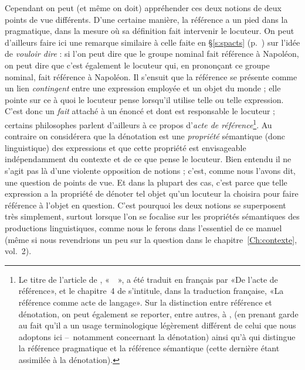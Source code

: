Cependant on peut (et même on doit) appréhender ces deux notions de
deux points de vue différents.  D'une certaine manière, la référence a
un pied dans la pragmatique, dans la mesure où sa définition fait
intervenir le locuteur.  On peut d'ailleurs faire ici une remarque
similaire à celle faite en \S\ref{s:spacts} (p.~\pageref{s:spacts})
sur l'idée de \emph{vouloir dire} : si l'on peut dire que le groupe
nominal  fait référence à Napoléon,
on peut dire 
que c'est également le locuteur qui, en prononçant ce groupe nominal,
fait référence à Napoléon.  Il s'ensuit que la référence se présente
comme un lien \emph{contingent} entre une expression employée et un
objet du monde ; elle pointe sur ce à quoi le locuteur pense lorsqu'il
utilise telle ou telle expression.  C'est donc un \emph{fait} attaché
à un énoncé et dont est responsable le locuteur ; certains philosophes
parlent d'ailleurs à ce propos d'\emph{acte de
  référence}\footnote{Le titre de l'article de \citet{Strawson:50fr},
  «~~», a été traduit en français par «De
  l'acte de référence», et le chapitre~4 de
  \citet{Sea:69Frb} s'intitule, dans la traduction française, «La
    référence comme acte de langage».  Sur la distinction entre
  référence et dénotation, on peut également se reporter, entre autres, à %
 \citet[][chap.~7]{Lyons:77Fr}, (en prenant garde au fait qu'il a un usage
terminologique légèrement différent de celui que nous adoptons ici --~notamment concernant la dénotation) ainsi qu'à \cite[][chap.~1 \& 2]{Abbott:10} qui distingue la référence pragmatique et la référence sémantique (cette dernière étant assimilée à la dénotation).}.
Au contraire on considérera que la dénotation est une \emph{propriété}
sémantique (donc linguistique) des expressions et que cette propriété
est envisageable indépendamment du contexte et de ce que pense le
locuteur.  Bien entendu il ne s'agit pas là d'une violente opposition
de notions ; c'est, comme nous l'avons dit, une question de points de
vue.  Et dans la plupart des cas, c'est parce que telle expression a
la propriété de dénoter tel objet qu'un locuteur la choisira pour faire
référence à l'objet en question.  C'est pourquoi les deux notions se
superposent très simplement, surtout lorsque l'on se focalise sur les
propriétés sémantiques des productions linguistiques, comme nous le
ferons dans l'essentiel de ce manuel (même si nous revendrions un peu
sur la question dans le chapitre~\ref{Ch:contexte}, vol.~2).





